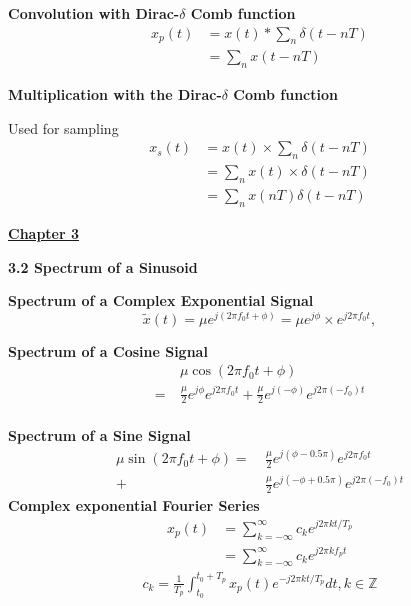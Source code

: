 \documentclass[landscape,a4paper]{extarticle}
\begin{document}
\begin{multicols*}{5}
    \textbf{Convolution with Dirac-$\delta$ Comb function}
    \begin{align*}
        x_p(t)&=x(t)*\sum_n\delta(t-nT)\\
        &=\sum_n x(t-nT)
    \end{align*}

    \textbf{Multiplication with the Dirac-$\delta$ Comb function}

    Used for sampling
    \begin{align*}
        x_s(t)&=x(t)\times\sum_n\delta(t-nT)\\
        &=\sum_nx(t)\times\delta(t-nT)\\
        &=\sum_nx(nT)\delta(t-nT)
    \end{align*}
    
    \textbf{\uline{Chapter 3}}

    \textbf{3.2 Spectrum of a Sinusoid}

    \textbf{Spectrum of a Complex Exponential Signal}
    \[
        \tilde{x}(t)=\mu e^{j(2\pi f_0t+\phi)} = \mu e^{j\phi} \times e^{j2\pi f_0t},
    \]

    \textbf{Spectrum of a Cosine Signal}
    \begin{align*}
        &\mu \cos(2\pi f_0t + \phi)\\
        = \ &\frac{\mu}{2}e^{j\phi}e^{j2\pi f_0t} + \frac{\mu}{2}  e^{j(-\phi)}e^{j2\pi (-f_0)t}
    \end{align*}\\
    \textbf{Spectrum of a Sine Signal}
    \begin{align*}
        \mu\sin(2\pi f_0 t + \phi)
        =\ &\frac{\mu}{2}e^{j(\phi - 0.5\pi)}e^{j2\pi f_0t} \\
        + \ &\frac{\mu}{2}e^{j(-\phi+0.5\pi)}e^{j2\pi (-f_0)t}
    \end{align*}
    \textbf{Complex exponential Fourier Series}
    \begin{align*}
        x_p(t)&=\sum_{k=-\infty}^{\infty}c_ke^{j2\pi kt/T_p}\\
        &=\sum_{k=-\infty}^{\infty}c_ke^{j2\pi kf_pt} \tag{3.1a}
    \end{align*}
    \begin{align*}
        c_k=\frac{1}{T_p}\int_{t_0}^{t_0+T_p}x_p(t)e^{-j2\pi kt/T_p}dt, k \in \mathbb{Z} \tag{3.1b}
    \end{align*}


\end{multicols*}
\end{document}
